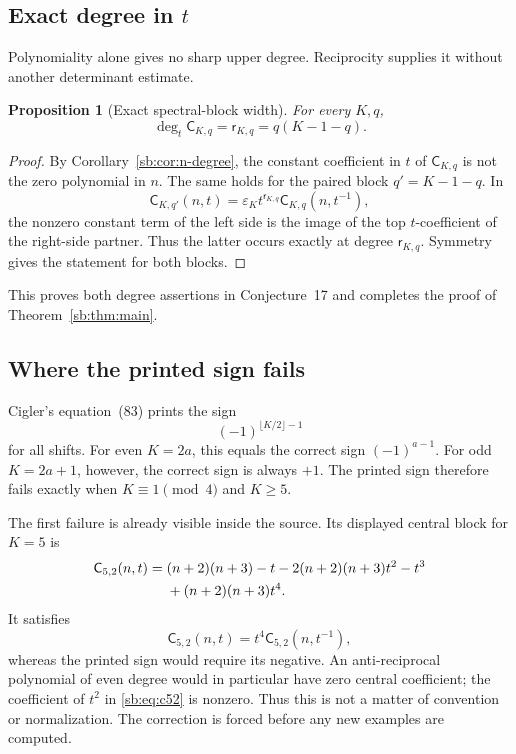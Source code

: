 \documentclass[11pt]{article}
\newtheorem{proposition}[theorem]{Proposition}
\theoremstyle{definition}
\theoremstyle{remark}
\newcommand{\Cblock}{\mathsf C}
\newcommand{\rdeg}{\mathsf r}
\newcommand{\epsK}{\varepsilon}
\theoremstyle{definition}
\theoremstyle{plain}
\numberwithin{equation}{section}
\begin{document}
\subsection{Exact degree in \texorpdfstring{$t$}{t}}
Polynomiality alone gives no sharp upper degree.  Reciprocity supplies it
without another determinant estimate.

\begin{proposition}[Exact spectral-block width]
\label{sb:prop:t-degree}
For every $K,q$,
\[
 \deg_t\Cblock_{K,q}=\rdeg_{K,q}=q(K-1-q).
\]
\end{proposition}

\begin{proof}
By Corollary~\ref{sb:cor:n-degree}, the constant coefficient in $t$ of
$\Cblock_{K,q}$ is not the zero polynomial in $n$.  The same holds for the
paired block $q'=K-1-q$.  In
\[
 \Cblock_{K,q'}(n,t)=\epsK_K t^{\rdeg_{K,q}}
 \Cblock_{K,q}(n,t^{-1}),
\]
the nonzero constant term of the left side is the image of the top
$t$-coefficient of the right-side partner.  Thus the latter occurs exactly
at degree $\rdeg_{K,q}$.  Symmetry gives the statement for both blocks.
\end{proof}

This proves both degree assertions in Conjecture~17 and completes the proof
of Theorem~\ref{sb:thm:main}.

\subsection{Where the printed sign fails}
\label{sb:sec:printed-sign}
Cigler's equation~(83) prints the sign
\begin{equation}
 (-1)^{\lfloor K/2\rfloor-1}
 \label{sb:eq:printed-sign}
\end{equation}
for all shifts.  For even $K=2a$, this equals the correct sign
$(-1)^{a-1}$.  For odd $K=2a+1$, however, the correct sign is always $+1$.
The printed sign therefore fails exactly when $K\equiv1\pmod4$ and $K\ge5$.

The first failure is already visible inside the source.  Its displayed
central block for $K=5$ is
\begin{align}
 \Cblock_{5,2}(n,t)={}&(n+2)(n+3)-t
 -2(n+2)(n+3)t^2-t^3\notag\\
 &+(n+2)(n+3)t^4.
 \label{sb:eq:c52}
\end{align}
It satisfies
\begin{equation}
 \Cblock_{5,2}(n,t)=t^4\Cblock_{5,2}(n,t^{-1}),
 \label{sb:eq:c52-palindromic}
\end{equation}
whereas the printed sign would require its negative.  An anti-reciprocal
polynomial of even degree would in particular have zero central coefficient;
the coefficient of $t^2$ in \eqref{sb:eq:c52} is nonzero.  Thus this is not a
matter of convention or normalization.  The correction is forced before any
new examples are computed.
\end{document}

